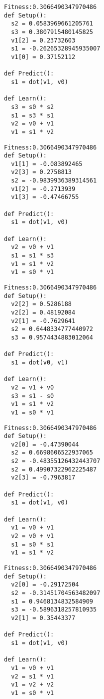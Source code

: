 \documentclass[twocolumn, a4j]{jarticle}
\begin{document}
\begin{lstlisting}[caption= No. 0.6]
Fitness:0.3066490347970486 
def Setup():
  s2 = 0.0583969661205761
  s3 = 0.3807915480145825
  v1[2] = 0.23732603
  s1 = -0.26265328945935007
  v1[0] = 0.37152112

def Predict():
  s1 = dot(v1, v0)

def Learn():
  s3 = s0 * s2
  s1 = s3 * s1
  v2 = v0 + v1
  v1 = s1 * v2

\end{lstlisting}

\newpage

\begin{lstlisting}[caption= No. 0.7]
Fitness:0.3066490347970486 
def Setup():
  v1[1] = -0.083892465
  v2[3] = 0.2758813
  s2 = -0.9839936389314561
  v1[2] = -0.2713939
  v1[3] = -0.47466755

def Predict():
  s1 = dot(v1, v0)

def Learn():
  v2 = v0 + v1
  s1 = s1 * s3
  v1 = s1 * v2
  v1 = s0 * v1

\end{lstlisting}

\begin{lstlisting}[caption= No. 0.8]
Fitness:0.3066490347970486 
def Setup():
  v2[2] = 0.5286188
  v2[2] = 0.48192084
  v2[1] = -0.7629641
  s2 = 0.6448334777440972
  s3 = 0.9574434883012064

def Predict():
  s1 = dot(v0, v1)

def Learn():
  v2 = v1 + v0
  s3 = s1 - s0
  v1 = s1 * v2
  v1 = s0 * v1

\end{lstlisting}

\newpage

\begin{lstlisting}[caption= No. 0.9]
Fitness:0.3066490347970486 
def Setup():
  v2[0] = -0.47390044
  s2 = 0.6698606522937065
  s2 = -0.48355126432443707
  s2 = 0.49907322962225487
  v2[3] = -0.7963817

def Predict():
  s1 = dot(v1, v0)

def Learn():
  v1 = v0 + v1
  v2 = v0 + v1
  s1 = s0 * s1
  v1 = s1 * v2

\end{lstlisting}

\begin{lstlisting}[caption= No. 0.10]
Fitness:0.3066490347970486 
def Setup():
  v2[0] = -0.29172504
  s2 = -0.31451704563482097
  s1 = 0.9468134832584909
  s3 = -0.5896318257810935
  v2[1] = 0.35443377

def Predict():
  s1 = dot(v1, v0)

def Learn():
  v1 = v0 + v1
  v2 = s1 * v1
  v1 = v2 + v2
  v1 = s0 * v1

\end{lstlisting}
\end{document}

